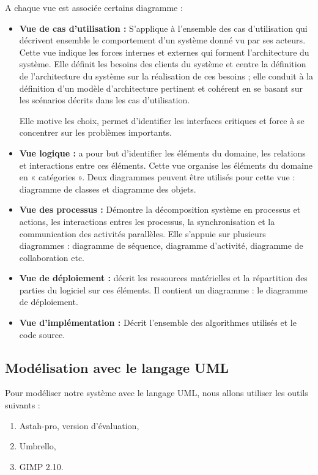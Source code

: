 		A chaque vue est associée certains diagramme :
		\begin{itemize}
			\item\textbf{ Vue de cas d'utilisation\citep{opensclass1} :}  S'applique à l'ensemble des cas d'utilisation qui décrivent ensemble le comportement d'un système donné vu par ses acteurs. Cette vue indique les forces internes et externes qui forment l'architecture du système. Elle définit les besoins des clients du système et centre la définition de l'architecture du système sur la réalisation de ces besoins ; elle conduit à la définition d'un modèle d'architecture pertinent et cohérent en se basant sur les scénarios décrits dans les cas d’utilisation.
			
Elle motive les choix, permet d'identifier les interfaces critiques et force à se concentrer sur les problèmes importants.
			\item \textbf{Vue logique : } a pour but d’identifier les éléments du domaine, les relations et interactions entre ces éléments. Cette vue organise les éléments du domaine en « catégories ». Deux diagrammes peuvent être utilisés pour cette vue : diagramme de classes et diagramme des objets.
			\item \textbf{Vue des processus :} Démontre la décomposition système en processus et actions, les interactions entres les processus, la synchronisation et la communication des activités parallèles. Elle s'appuie sur plusieurs diagrammes : diagramme de séquence, diagramme d'activité, diagramme de collaboration etc.
			\item \textbf{Vue de déploiement :} décrit les ressources matérielles et la répartition des parties du logiciel sur ces éléments. Il contient un diagramme : le diagramme de déploiement.
			
			\item \textbf{Vue d'implémentation :} Décrit l'ensemble des algorithmes utilisés et le code source\cite{opensclass1}.


		\end{itemize}
		
		\subsection{Modélisation avec le langage UML}
		Pour modéliser notre système avec le langage UML, nous allons utiliser les outils suivants :
		\begin{enumerate}
			\item Astah-pro, version d'évaluation,
			\item Umbrello,
			\item GIMP 2.10.
		\end{enumerate}
			
